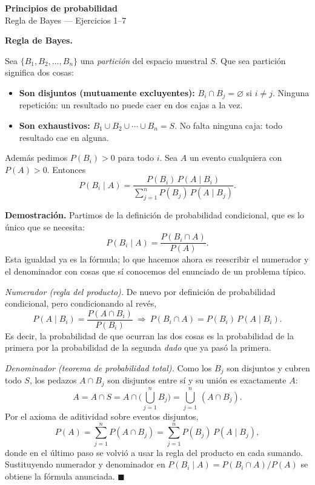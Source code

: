 \documentclass[11pt]{article}
\begin{document}
\begin{center}{\LARGE\bfseries Principios de probabilidad}\\[2pt]{\large Regla de Bayes --- Ejercicios 1--7}\end{center}

\vspace{4pt}

\begin{teo}
\textbf{Regla de Bayes.}

Sea $\{B_1,B_2,\dots,B_n\}$ una \emph{partición} del espacio muestral $S$. Que sea partición significa dos cosas:
\begin{itemize}[nosep,leftmargin=*]
  \item \textbf{Son disjuntos (mutuamente excluyentes):} $B_i\cap B_j=\varnothing$ si $i\neq j$. Ninguna repetición: un resultado no puede caer en dos cajas a la vez.
  \item \textbf{Son exhaustivos:} $B_1\cup B_2\cup\cdots\cup B_n=S$. No falta ninguna caja: todo resultado cae en alguna.
\end{itemize}
Además pedimos $P(B_i)>0$ para todo $i$. Sea $A$ un evento cualquiera con $P(A)>0$. Entonces
\[
P(B_i\mid A)=\frac{P(B_i)\,P(A\mid B_i)}{\displaystyle\sum_{j=1}^{n}P(B_j)\,P(A\mid B_j)}.
\]

\medskip
\textbf{Demostración.} Partimos de la definición de probabilidad condicional, que es lo único que se necesita:
\[
P(B_i\mid A)=\frac{P(B_i\cap A)}{P(A)}.
\]
Esta igualdad ya es la fórmula; lo que hacemos ahora es reescribir el numerador y el denominador con cosas que sí conocemos del enunciado de un problema típico.

\emph{Numerador (regla del producto).} De nuevo por definición de probabilidad condicional, pero condicionando al revés,
\[
P(A\mid B_i)=\frac{P(A\cap B_i)}{P(B_i)}\ \Longrightarrow\ P(B_i\cap A)=P(B_i)\,P(A\mid B_i).
\]
Es decir, la probabilidad de que ocurran las dos cosas es la probabilidad de la primera por la probabilidad de la segunda \emph{dado} que ya pasó la primera.

\emph{Denominador (teorema de probabilidad total).} Como los $B_j$ son disjuntos y cubren todo $S$, los pedazos $A\cap B_j$ son disjuntos entre sí y su unión es exactamente $A$:
\[
A=A\cap S=A\cap\Big(\bigcup_{j=1}^{n}B_j\Big)=\bigcup_{j=1}^{n}\,(A\cap B_j).
\]
Por el axioma de aditividad sobre eventos disjuntos,
\[
P(A)=\sum_{j=1}^{n}P(A\cap B_j)=\sum_{j=1}^{n}P(B_j)\,P(A\mid B_j),
\]
donde en el último paso se volvió a usar la regla del producto en cada sumando. Sustituyendo numerador y denominador en $P(B_i\mid A)=P(B_i\cap A)/P(A)$ se obtiene la fórmula anunciada. $\blacksquare$


\end{teo}
\end{document}
